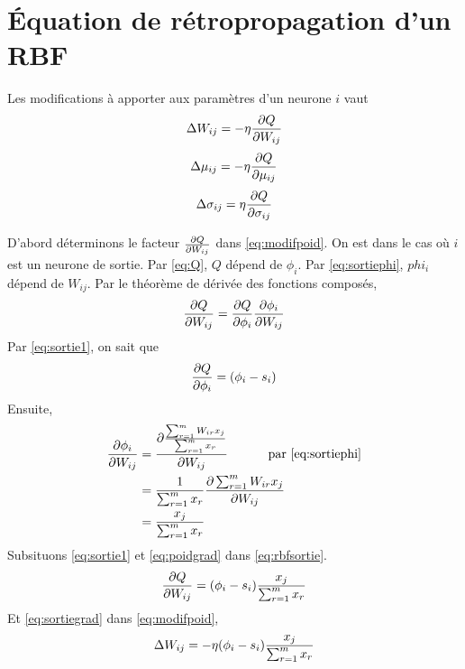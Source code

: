 \section{Équation de rétropropagation d'un RBF}\label{sec:eqrbf}
Les modifications à apporter aux paramètres d'un neurone $i$ vaut
\begin{equation}\label{eq:modifpoid}
 \Delta W_{ij} = -\eta \frac{\partial Q}{\partial W_{ij}}
\end{equation}
\begin{equation}\label{eq:modifmu}
 \Delta \mu_{ij} = -\eta \frac{\partial Q}{\partial \mu_{ij}}
\end{equation}
\begin{equation}\label{eq:modifsigma}
 \Delta \sigma_{ij} = \eta \frac{\partial Q}{\partial \sigma_{ij}}
\end{equation}

D'abord déterminons le facteur $\frac{\partial Q}{\partial W_{ij}}$ dans \eqref{eq:modifpoid}.
On est dans le cas où $i$ est un neurone de sortie.
Par \eqref{eq:Q}, $Q$ dépend de $\phi_i$.
Par \eqref{eq:sortiephi}, $phi_i$ dépend de $W_{ij}$.
Par le théorème de dérivée des fonctions composés,
\begin{equation}\label{eq:rbfsortie}
 \frac{\partial Q}{\partial W_{ij}} = \frac{\partial Q}{\partial \phi_i} \frac{\partial \phi_i}{\partial W_{ij}}
\end{equation}
Par \eqref{eq:sortie1}, on sait que
\[\frac{\partial Q}{\partial \phi_i} = (\phi_i - s_i)\]
Ensuite,
\begin{equation}\label{eq:poidgrad}
 \begin{split}
  \frac{\partial \phi_i}{\partial W_{ij}} & = \frac{\partial \frac{\sum_{r=1}^{m}W_{ir}x_{j}}{\sum_{r=1}^{m}x_{r}}}{\partial W_{ij}} \text{\hspace{1cm} par \eqref{eq:sortiephi}}\\
  ~ & = \frac{1}{\sum_{r=1}^{m}x_{r}} \frac{\partial \sum_{r=1}^{m}W_{ir}x_{j}}{\partial W_{ij}}\\
  ~ & = \frac{x_j}{\sum_{r=1}^{m}x_{r}}
 \end{split}
\end{equation}
Subsituons \eqref{eq:sortie1} et \eqref{eq:poidgrad} dans \eqref{eq:rbfsortie}.
\begin{equation}\label{eq:sortiegrad}
 \frac{\partial Q}{\partial W_{ij}} = (\phi_i - s_i) \frac{x_j}{\sum_{r=1}^{m}x_{r}}
\end{equation}
Et \eqref{eq:sortiegrad} dans \eqref{eq:modifpoid},
\[\Delta W_{ij} = -\eta (\phi_i - s_i) \frac{x_j}{\sum_{r=1}^{m}x_{r}}\]\\

